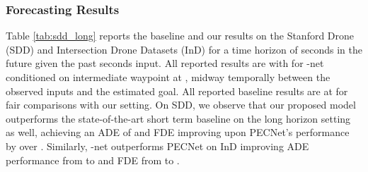 \documentclass[final]{cvpr}
\begin{document}
\begin{table}[]
\begin{center}
\end{center}

\caption{\textbf{Ablation results for Conditioned Waypoint Sampling () and }: We benchmark the performance of -net with and without our proposed  and  on our long horizon forecasting setting, predicting  seconds into the future given  seconds of past motion history. All reported errors are in pixels (lower is better) for ,  and .}

\label{tab:ttst}
\end{table}

\subsubsection{Forecasting Results}Table \ref{tab:sdd_long} reports the baseline and our results on the Stanford Drone (SDD) and Intersection Drone Datasets (InD) for a time horizon of  seconds in the future given the past  seconds input. All reported results are with  for -net conditioned on  intermediate waypoint at , \ie midway temporally between the observed inputs and the estimated goal. All reported baseline results are at  for fair comparisons with our  setting. On SDD, we observe that our proposed model outperforms the state-of-the-art short term baseline on the long horizon setting as well, achieving an ADE of  and FDE  improving upon PECNet's performance by over . Similarly, -net outperforms PECNet on InD improving ADE performance from  to  and FDE from  to . 
\end{document}
